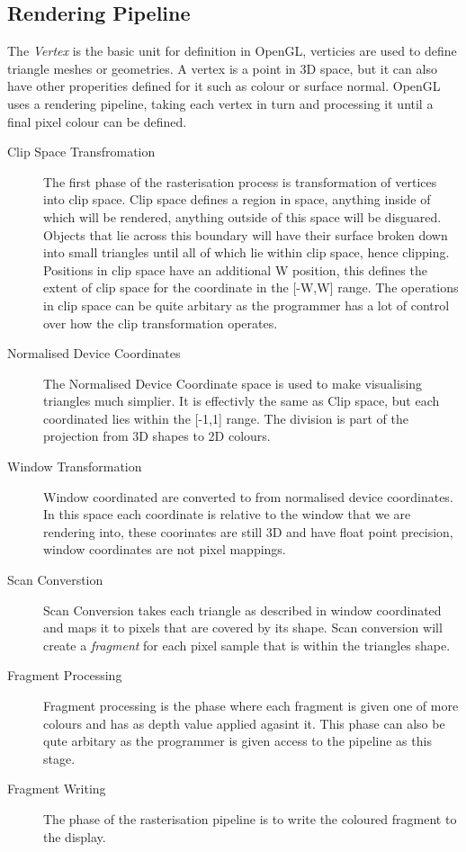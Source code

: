 \subsection{Rendering Pipeline}

The \emph{Vertex} is the basic unit for definition in OpenGL, verticies are used
to define triangle meshes or geometries. A vertex is a point in 3D space, but it
can also have other properities defined for it such as colour or surface normal.
OpenGL uses a rendering pipeline, taking each vertex in turn and processing it 
until a final pixel colour can be defined. \\

\begin{description}
\item[Clip Space Transfromation] The first phase of the rasterisation process
is transformation of vertices into clip space. Clip space defines a region in 
space, anything inside of which will be rendered, anything outside of this space
will be disguared. Objects that lie across this boundary will have their surface
broken down into small triangles until all of which lie within clip space, hence
clipping. Positions in clip space have an additional W position, this defines the
extent of clip space for the coordinate in the [-W,W] range.
The operations in clip space can be quite arbitary as the programmer 
has a lot of control over how the clip transformation operates.

\item[Normalised Device Coordinates] The Normalised Device Coordinate space is 
used to make visualising triangles much simplier. It is effectivly the same as 
Clip space, but each coordinated lies within the [-1,1] range. The division is 
part of the projection from 3D shapes to 2D colours.
\item[Window Transformation] Window coordinated are converted to from normalised
device coordinates. In this space each coordinate is relative to the window that
we are rendering into, these coorinates are still 3D and have float point 
precision, window coordinates are not pixel mappings.
\item[Scan Converstion] Scan Conversion takes each triangle as described in 
window coordinated and maps it to pixels that are covered by its shape. Scan 
conversion will create a \emph{fragment} for each pixel sample that is within
the triangles shape.
\item[Fragment Processing] Fragment processing is the phase where each fragment 
is given one of more colours and has as depth value applied agasint it. This 
phase can also be qute arbitary as the programmer is given access to the pipeline
as this stage.
\item[Fragment Writing] The phase of the rasterisation pipeline is to write the 
coloured fragment to the display.
\end{description}

